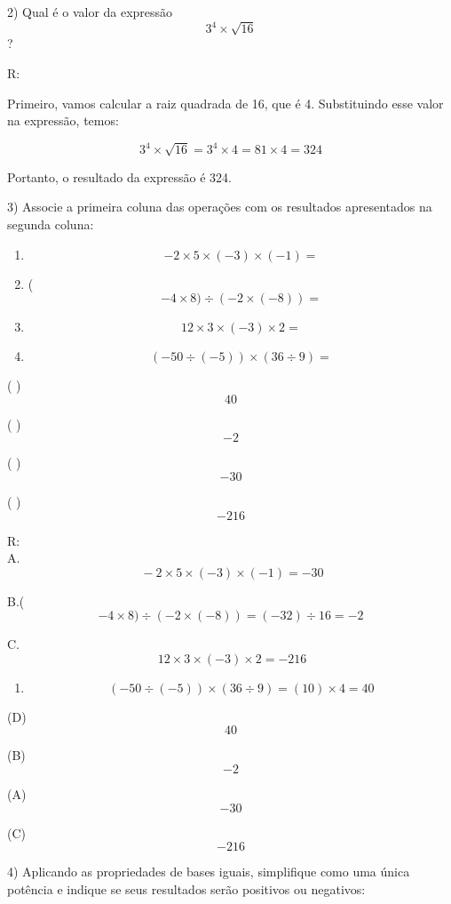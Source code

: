 2) Qual é o valor da expressão \[3^4 \times \sqrt{16}\]?

R:

Primeiro, vamos calcular a raiz quadrada de 16, que é 4. Substituindo
esse valor na expressão, temos:

\[3^4 \times \sqrt{16} = 3^4 \times 4 = 81 \times 4 = 324\]

Portanto, o resultado da expressão é 324.

3) Associe a primeira coluna das operações com os resultados
apresentados na segunda coluna:

\begin{enumerate}
\def\labelenumi{\Alph{enumi}.}
\item
  \[- 2 \times 5 \times \left( - 3 \right) \times \left( - 1 \right) =\]
\item
  (\[- 4 \times 8) \div ( - 2 \times \left( - 8 \right)) =\]
\item
  \[12 \times 3 \times \left( - 3 \right) \times 2 =\]
\item
  \[( - 50 \div \left( - 5 \right)) \times (36 \div 9) =\]
\end{enumerate}

( ) \[40\]

( ) \[- 2\]

( ) \[- 30\]

( ) \[- 216\]

R:\\
A.\[\  - 2 \times 5 \times \left( - 3 \right) \times \left( - 1 \right) = - 30\]

B.(\[- 4 \times 8) \div ( - 2 \times \left( - 8 \right)) = \left( - 32 \right) \div 16 = - 2\]

C.\[\ 12 \times 3 \times \left( - 3 \right) \times 2 = - 216\]

\begin{enumerate}
\def\labelenumi{\Alph{enumi}.}
\setcounter{enumi}{3}
\tightlist
\item
  \[\left( - 50 \div \left( - 5 \right) \right) \times \left( 36 \div 9 \right) = \left( 10 \right) \times 4 = 40\]
\end{enumerate}

(D) \[40\]

(B) \[- 2\]

(A) \[- 30\]

(C) \[- 216\]

4) Aplicando as propriedades de bases iguais, simplifique como uma única
potência e indique se seus resultados serão positivos ou negativos:

